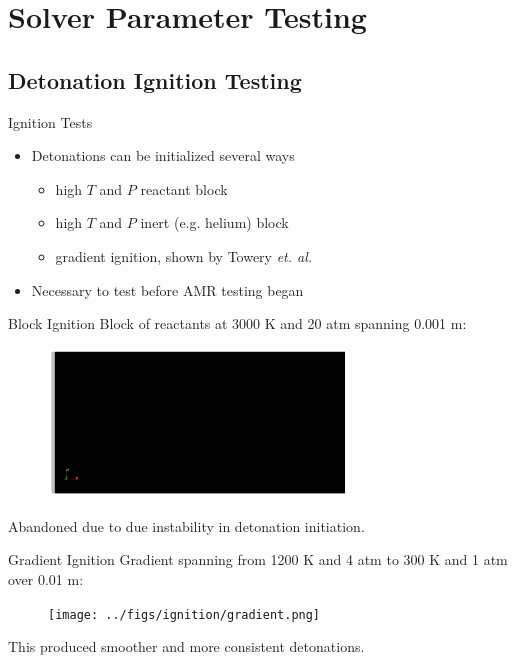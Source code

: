 \section{Solver Parameter Testing}
\subsection{Detonation Ignition Testing}

\begin{frame}{Ignition Tests}
\begin{itemize}
\item Detonations can be initialized several ways
\begin{itemize}
    \item high $T$ and $P$ reactant block
    \item high $T$ and $P$ inert (e.g. helium) block
    \item gradient ignition, shown by Towery \textit{et. al.} \cite{towery2}
\end{itemize}
\item Necessary to test before AMR testing began 
\end{itemize}    
\end{frame}

\begin{frame}{Block Ignition}
Block of reactants at 3000 K and 20 atm spanning 0.001 m:
\begin{figure}[]
\centering
\includegraphics[width=0.7\textwidth]{../figs/ignition/block.png}
\end{figure}%
Abandoned due to due instability in detonation initiation.
\end{frame}

\begin{frame}{Gradient Ignition}
Gradient spanning from 1200 K and 4 atm to 300 K and 1 atm over 0.01 m:
\begin{figure}[]
\centering
\texttt{[image: ../figs/ignition/gradient.png]}
\end{figure}%
This produced smoother and more consistent detonations. 
\end{frame}

